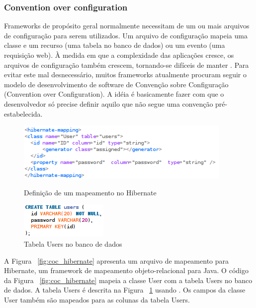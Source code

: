 \subsubsection{Convention over configuration}
Frameworks de propósito geral normalmente necessitam de um ou mais arquivos de configuração
para serem utilizados. Um arquivo de configuração mapeia uma classe e um recurso (uma tabela
no banco de dados) ou um evento (uma requisição web). À medida em que a complexidade das
aplicações cresce, os arquivos de configuração também crescem, tornando-se difíceis de manter \cite{Chen}. 
Para evitar este mal desnecessário, muitos frameworks atualmente procuram seguir o modelo
de desenvolvimento de software de Convenção sobre Configuração (Convention over Configuration).
A idéia é basicamente fazer com que o desenvolvedor só precise definir aquilo que não segue 
uma convenção pré-estabelecida. 

\begin{figure}[!htbp]
\begin{minipage}[t]{0.5\linewidth}
\includegraphics[scale=0.75]{fig/coc_hibernate.png}
\caption{Definição de um mapeamento no Hibernate}\label{fig:coc_hibernate}
\end{minipage} \hfill
\begin{minipage}[t]{0.3\linewidth}
\includegraphics[scale=0.75]{fig/coc_tabela.png}
\caption{Tabela Users no banco de dados}\label{fig:coc_tabela}
\end{minipage}
\end{figure}

A Figura ~\ref{fig:coc_hibernate} apresenta um arquivo de mapeamento para Hibernate,
um framework de mapeamento objeto-relacional para Java. O código da Figura ~\ref{fig:coc_hibernate}
mapeia a classe User com a tabela Users no banco de dados. A tabela Users é descrita 
na Figura ~\ref{fig:coc_tabela} usando . Os campos da classe User também são mapeados
para as colunas da tabela Users.

